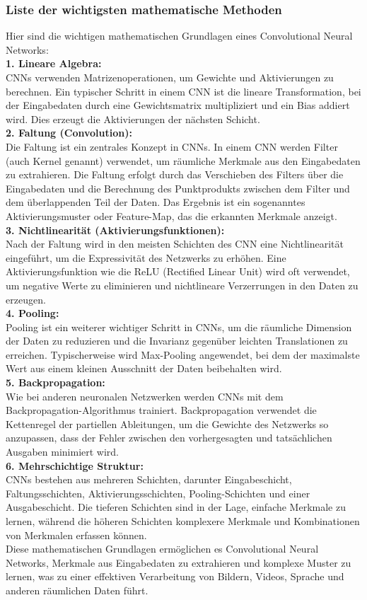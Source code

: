 \documentclass[12pt]{article}
\begin{document}
\subsubsection{Liste der wichtigsten mathematische Methoden}
Hier sind die wichtigen mathematischen Grundlagen eines Convolutional Neural Networks:\\
%
\textbf{1. Lineare Algebra:}\\
CNNs verwenden Matrizenoperationen, um Gewichte und Aktivierungen zu berechnen. Ein typischer Schritt in einem CNN ist die lineare Transformation, bei der Eingabedaten durch eine Gewichtsmatrix multipliziert und ein Bias addiert wird. Dies erzeugt die Aktivierungen der nächsten Schicht.\\
\textbf{2. Faltung (Convolution):}\\
Die Faltung ist ein zentrales Konzept in CNNs. In einem CNN werden Filter (auch Kernel genannt) verwendet, um räumliche Merkmale aus den Eingabedaten zu extrahieren. Die Faltung erfolgt durch das Verschieben des Filters über die Eingabedaten und die Berechnung des Punktprodukts zwischen dem Filter und dem überlappenden Teil der Daten. Das Ergebnis ist ein sogenanntes Aktivierungsmuster oder Feature-Map, das die erkannten Merkmale anzeigt.\\
\textbf{3. Nichtlinearität (Aktivierungsfunktionen):}\\
Nach der Faltung wird in den meisten Schichten des CNN eine Nichtlinearität eingeführt, um die Expressivität des Netzwerks zu erhöhen. Eine Aktivierungsfunktion wie die ReLU (Rectified Linear Unit) wird oft verwendet, um negative Werte zu eliminieren und nichtlineare Verzerrungen in den Daten zu erzeugen.\\
\textbf{4. Pooling:}\\
Pooling ist ein weiterer wichtiger Schritt in CNNs, um die räumliche Dimension der Daten zu reduzieren und die Invarianz gegenüber leichten Translationen zu erreichen. Typischerweise wird Max-Pooling angewendet, bei dem der maximalste Wert aus einem kleinen Ausschnitt der Daten beibehalten wird.\\
\textbf{5. Backpropagation:}\\
Wie bei anderen neuronalen Netzwerken werden CNNs mit dem Backpropagation-Algorithmus trainiert. Backpropagation verwendet die Kettenregel der partiellen Ableitungen, um die Gewichte des Netzwerks so anzupassen, dass der Fehler zwischen den vorhergesagten und tatsächlichen Ausgaben minimiert wird.\\
\textbf{6. Mehrschichtige Struktur:}\\
CNNs bestehen aus mehreren Schichten, darunter Eingabeschicht, Faltungsschichten, Aktivierungsschichten, Pooling-Schichten und einer Ausgabeschicht. Die tieferen Schichten sind in der Lage, einfache Merkmale zu lernen, während die höheren Schichten komplexere Merkmale und Kombinationen von Merkmalen erfassen können.
\\
Diese mathematischen Grundlagen ermöglichen es Convolutional Neural Networks, Merkmale aus Eingabedaten zu extrahieren und komplexe Muster zu lernen, was zu einer effektiven Verarbeitung von Bildern, Videos, Sprache und anderen räumlichen Daten führt.
%
\end{document}
